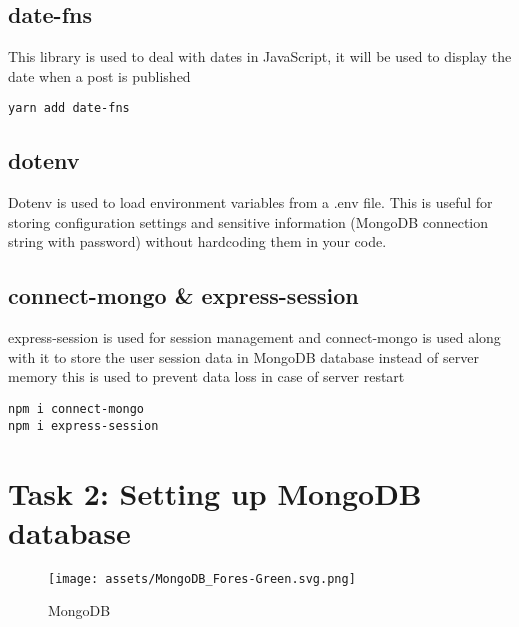 \documentclass[12pt]{article}
\begin{document}
\subsection{date-fns}

This library is used to deal with dates in JavaScript, it will be used to display the date when a post is published
 
\begin{listing}[htbp]
\begin{verbatim}
yarn add date-fns
\end{verbatim}
\end{listing}



\subsection{dotenv}

Dotenv is used to load environment variables from a .env file. This is useful for storing configuration settings and sensitive information (MongoDB connection string with password) without hardcoding them in your code.


\subsection{connect-mongo \& express-session}

express-session is used for session management and connect-mongo is used along with it to store the user session data in MongoDB database instead of server memory this is used to prevent data loss in case of server restart

\begin{listing}[H]
\begin{verbatim}
npm i connect-mongo
npm i express-session
\end{verbatim}
\end{listing}


\clearpage


\section{Task 2: Setting up MongoDB database}

\begin{figure}[H]
    \centering
    \texttt{[image: assets/MongoDB\_Fores-Green.svg.png]}
    \caption{MongoDB}
    \label{fig:logo}
\end{figure}
\end{document}
